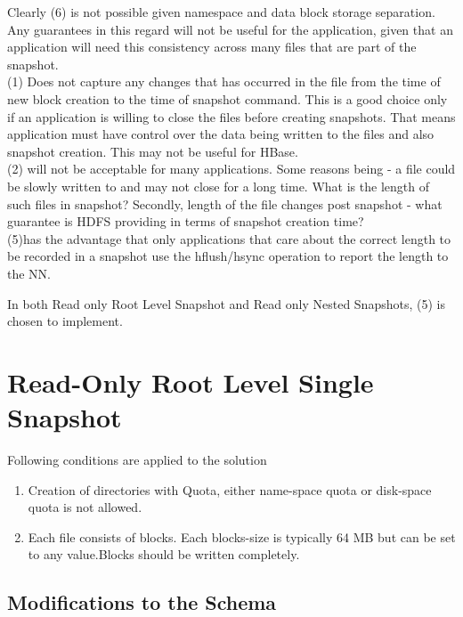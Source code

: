 Clearly (6) is not possible given namespace and data block storage separation. Any guarantees in this regard will not be useful for the application, given that an application will need this consistency across many files that are part of the snapshot. \\
(1) Does not capture any changes that has occurred in the file from the time of new
block creation to the time of snapshot command. This is a good choice only if an application is willing to close the files before creating snapshots. That means application must have control over the data being written to the files and also snapshot creation. This may not be useful for HBase.\\
(2) will not be acceptable for many applications. Some reasons being - a file could be slowly written to and may not close for a long time. What is the length of such files in snapshot? Secondly, length of the file changes post snapshot - what guarantee is HDFS providing in terms of snapshot creation time?\\
(5)has the advantage that only applications that care about the correct length to be recorded in a snapshot use the hflush/hsync operation to report the length to the NN.

In both Read only Root Level Snapshot and Read only Nested Snapshots, (5) is chosen to implement.\\

\section{Read-Only Root Level Single Snapshot}


Following conditions are applied to the solution
\begin{enumerate}
\item Creation of directories with Quota, either name-space quota or disk-space quota is not allowed.
\item Each file consists of blocks. Each blocks-size is typically 64 MB but can be set to any value.Blocks should be written completely.
\end{enumerate}



\subsection{Modifications to the Schema}

